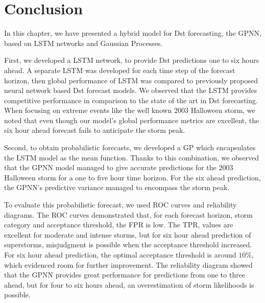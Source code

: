 \section{Conclusion}


In this chapter, we have presented a hybrid model for Dst forecasting, the GPNN, based on LSTM networks and Gaussian Processes. 

First, we developed a LSTM network, to provide Dst predictions one to six hours ahead. A separate LSTM was 
developed for each time step of the forecast horizon, then global performance of LSTM was compared to previously 
proposed neural network based Dst forecast models. We observed that the LSTM provides competitive performance 
in comparison to the state of the art in Dst forecasting. When focusing on extreme events like the well known 
$2003$ Halloween storm, we noted that even though our model's global performance metrics are excellent, 
the six hour ahead forecast fails to anticipate the storm peak. 

Second, to obtain probabilistic forecasts, we developed a GP which encapsulates the LSTM model as the mean function. 
Thanks to this combination, we observed that the GPNN model managed to give accurate predictions for the $2003$ 
Halloween storm for a one to five hour time horizon. For the six ahead prediction, the GPNN's predictive variance managed to encompass the storm peak. 

To evaluate this probabilistic forecast, we used ROC curves and reliability diagrams. The ROC curves demonstrated that, 
for each forecast horizon, storm category and acceptance threshold, the FPR is low. The TPR, values are excellent 
for moderate and intense storms, but for six hour ahead prediction of superstorms, misjudgment is possible when 
the acceptance threshold increased. For six hour ahead prediction, the optimal acceptance threshold is around 
$10\%$, which evidenced room for further improvement. The reliability diagram showed that the GPNN provides 
great performance for predictions from one to three ahead, but for four to six hours ahead, an overestimation of 
storm likelihoods is possible.


